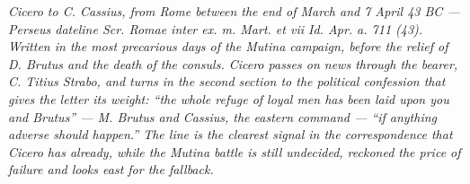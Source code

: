 
\textit{Cicero to C. Cassius, from Rome between the end of March and 7 April
43 BC --- Perseus dateline \textit{Scr. Romae inter ex. m. Mart. et vii Id.
Apr. a. 711 (43)}. Written in the most precarious days of the Mutina
campaign, before the relief of D. Brutus and the death of the consuls.
Cicero passes on news through the bearer, C. Titius Strabo, and turns
in the second section to the political confession that gives the letter
its weight: ``the whole refuge of loyal men has been laid upon you and
Brutus'' --- M. Brutus and Cassius, the eastern command --- ``if anything
adverse should happen.'' The line is the clearest signal in the
correspondence that Cicero has already, while the Mutina battle is
still undecided, reckoned the price of failure and looks east for the
fallback.}
